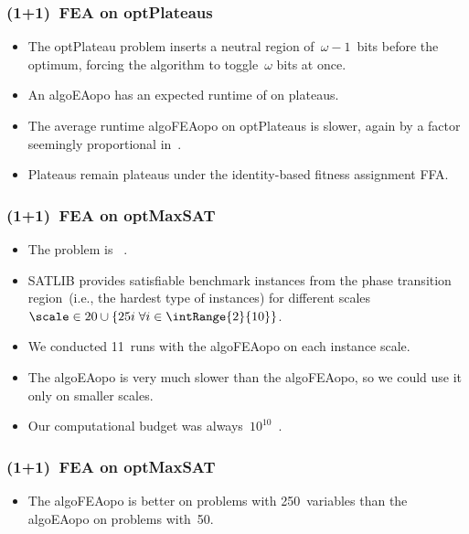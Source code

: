\documentclass[aspectratio=169,mathserif,notheorems]{beamer}%
\begin{document}
%
\begin{frame}%
\frametitle{(1+1)~FEA on \glspl{optPlateau}}%
\parbox{0.37\paperwidth}{%
\begin{itemize}%
\item The \gls{optPlateau} problem inserts a neutral region of~$\omega-1$~bits before the optimum, forcing the algorithm to toggle~$\omega$ bits at once\cite{AD2018PRAFP}.%
\item<2-> An \gls{algoEAopo} has an expected runtime of \bigThetab{\scale^{\omega}} on plateaus\cite{AD2018PRAFP}.%
\item<3-> The average runtime \gls{algoFEAopo} on \glspl{optPlateau} is slower, again by a factor seemingly proportional in~\scale.%
\item<4-> Plateaus remain plateaus under the identity-based fitness assignment FFA.%
\end{itemize}%
}%
%
%
%
%
\end{frame}%
%
\begin{frame}%
\frametitle{(1+1)~FEA on \gls{optMaxSAT}}%
\begin{itemize}%
\item The \cite{HS2005SLSFAA,C1971TCOTPP} problem is \npComplete~\cite{C1971TCOTPP}.%
\item<2-> \gls{SATLIB}\cite{HS2000SAORFROS} provides satisfiable benchmark instances from the phase transition region~(i.e., the hardest type of instances) for different scales~$\scale\in20 \cup \{25 i\; \forall i \in \intRange{2}{10}\}$.%
\item<3-> We conducted 11~runs with the \gls{algoFEAopo} on each instance scale.%
\item<4-> The \gls{algoEAopo} is very much slower than the \gls{algoFEAopo}, so we could use it only on smaller scales.%
\item<5-> Our computational budget was always~$10^{10}$~.%
\end{itemize}%
%
\end{frame}%
%
\begin{frame}%
\frametitle{(1+1)~FEA on \gls{optMaxSAT}}%
\parbox{0.25\paperwidth}{%
\begin{itemize}%
\item The \gls{algoFEAopo} is better on problems with 250~variables than the \gls{algoEAopo} on problems with~50.%
\end{itemize}%
}%
%
%
%
\end{frame}%
\end{document}
